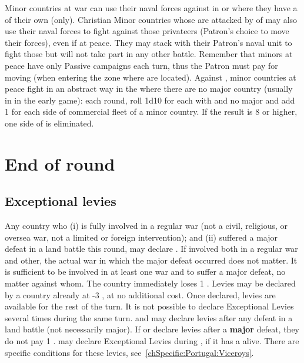\bparag Minor countries at war can use their naval forces against \corsaire in
\STZ or \CTZ where they have a \TradeFLEET of their own (only).
\bparag Christian Minor countries whose \TradeFLEET are attacked by \corsaire
of \Barbaresques may also use their naval forces to fight against those
privateers (Patron's choice to move their forces), even if at peace. They may
stack with their Patron's naval unit to fight those \corsaire but will not
take part in any other battle.
\bparag Remember that minors at peace have only Passive campaigns each turn,
thus the Patron must pay for moving (when entering the zone where \corsaire
are located).
\bparag Against , minor countries at peace fight in an abstract
way in the \STZ where there are no major country \TradeFLEET (usually in
 in the early game): each round, roll 1d10 for each \STZ with
 \corsaire and no major \TradeFLEET and add 1 for each side of
commercial fleet of a minor country.  If the result is 8 or higher, one
side of \corsaire is eliminated.

\section{End of round}
\label{chMilitary:End of round}
\subsection{Exceptional levies}
\label{chMilitary:Exceptional Levies}

\bparag Any country who (i) is fully involved in a regular war (not a civil,
religious, or oversea war, not a limited or foreign intervention); and (ii)
suffered a major defeat in a land battle this round, may declare
.
\bparag If involved both in a regular war and other, the actual war in which
the major defeat occurred does not matter. It is sufficient to be involved in
at least one war and to suffer a major defeat, no matter against whom.
\bparag The country immediately loses 1 \STAB. Levies may be declared by a
country already at -3 \STAB, at no additional cost.
\bparag Once declared, levies are available for the rest of the turn. It is
not possible to declare Exceptional Levies several times during the same
turn.
\bparag[Exception:] \SUE and \PRU may declare levies after any defeat in a land
battle (not necessarily major).
\bparag[Exception:] If \SUE or \PRU declare levies after a \textbf{major}
defeat, they do not pay 1 \STAB.
\bparag[Exception:] \POR may declare Exceptional Levies during , if it has a  alive. There are specific conditions for
these levies, see~\ref{chSpecific:Portugal:Viceroys}.

